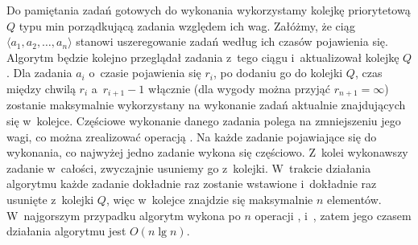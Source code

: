 Do pamiętania zadań gotowych do wykonania wykorzystamy kolejkę priorytetową $Q$ typu min porządkującą zadania względem ich wag.
Załóżmy, że ciąg $\langle a_1,a_2,\dots,a_n\rangle$ stanowi uszeregowanie zadań według ich czasów pojawienia się.
Algorytm będzie kolejno przeglądał zadania z~tego ciągu i~aktualizował kolejkę $Q$.
Dla zadania $a_i$ o~czasie pojawienia się $r_i$, po dodaniu go do kolejki $Q$, czas między chwilą $r_i$ a~$r_{i+1}-1$ włącznie (dla wygody można przyjąć $r_{n+1}=\infty$) zostanie maksymalnie wykorzystany na wykonanie zadań aktualnie znajdujących się w~kolejce.
Częściowe wykonanie danego zadania polega na zmniejszeniu jego wagi, co można zrealizować operacją .
Na każde zadanie pojawiające się do wykonania, co najwyżej jedno zadanie wykona się częściowo.
Z~kolei wykonawszy zadanie w~całości, zwyczajnie usuniemy go z~kolejki.
W~trakcie działania algorytmu każde zadanie dokładnie raz zostanie wstawione i~dokładnie raz usunięte z~kolejki $Q$, więc w~kolejce znajdzie się maksymalnie $n$ elementów.
W~najgorszym przypadku algorytm wykona po $n$ operacji ,  i~, zatem jego czasem działania algorytmu jest $O(n\lg n)$.
